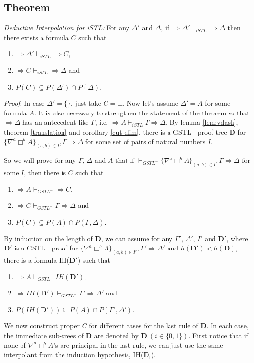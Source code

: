 \subsection{Theorem} \textit{Deductive Interpolation for iSTL: } For any $\Delta'$ and $\Delta$, if $\Rightarrow \Delta' \vdash_{iSTL} \Rightarrow \Delta$ then there exists a formula $C$ such that
\begin{enumerate}
	\item $\Rightarrow \Delta' \vdash_{iSTL} \Rightarrow C$,
	\item $\Rightarrow C \vdash_{iSTL} \Rightarrow \Delta$ and
	\item $P(C) \subseteq P(\Delta') \cap P(\Delta)$.
\end{enumerate}

\textit{Proof}: In case $\Delta' = \{\}$, just take $C = \bot$. Now let's assume $\Delta' = A$ for some formula $A$. It is also necessary to strengthen the statement of the theorem so that $\Rightarrow \Delta$ has an antecedent like $\Gamma$, i.e. $\Rightarrow A \vdash_{iSTL} \Gamma \Rightarrow \Delta$. By lemma \ref{lem:vdash}, theorem \ref{translation} and corollary \ref{cut-elim}, there is a GSTL$^-$ proof tree $\mathbf{D}$ for $\{ \nabla^a \Box^b A \}_{(a,b) \in I} , \Gamma \Rightarrow \Delta$ for some set of pairs of natural numbers $I$.

So we will prove for any $\Gamma$, $\Delta$ and $A$ that if $\vdash_{GSTL^-} \{ \nabla^a \Box^b A \}_{(a,b) \in I} , \Gamma \Rightarrow \Delta$ for some $I$, then there is $C$ such that
\begin{enumerate}
	\item $\Rightarrow A \vdash_{GSTL^-} \Rightarrow C$, 
	\item $\Rightarrow C \vdash_{GSTL^-} \Gamma \Rightarrow \Delta$ and
	\item $P(C) \subseteq P(A) \cap P(\Gamma,\Delta)$.
\end{enumerate}
By induction on the length of $\mathbf{D}$, we can assume for any $\Gamma'$, $\Delta'$, $I'$ and $\mathbf{D}'$, where $\mathbf{D}'$ is a GSTL$^-$ proof for $\{ \nabla^a \Box^b A \}_{(a,b) \in I'} , \Gamma' \Rightarrow \Delta'$ and $h(\mathbf{D}')<h(\mathbf{D})$, there is a formula IH($\mathbf{D}'$) such that
\begin{enumerate}
	\item $\Rightarrow A \vdash_{GSTL^-} IH(\mathbf{D}')$,
	\item $\Rightarrow IH(\mathbf{D}') \vdash_{GSTL^-} \Gamma' \Rightarrow \Delta'$ and
	\item $P(IH(\mathbf{D}')) \subseteq P(A) \cap P(\Gamma',\Delta')$.
\end{enumerate}
We now construct proper $C$ for different cases for the last rule of $\mathbf{D}$. In each case, the immediate sub-trees of $\mathbf{D}$ are denoted by $\mathbf{D_i} (i \in \{0,1\})$. First notice that if none of $\nabla^a \Box^b A$'s are principal in the last rule, we can just use the same interpolant from the induction hypothesis, IH($\mathbf{D_i}$). 

